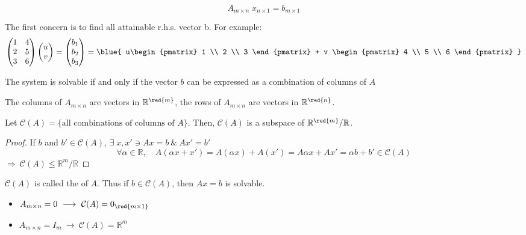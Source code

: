 \newpage

\begin{eg}
    \[
    A_{m\times n}\; x_{n\times 1} = b_{m\times1}
    \]
\end{eg}
The first concern is to find all attainable r.h.s. vector b. For example: 
\[
\begin{pmatrix}
    1 & 4 \\
    2 & 5 \\
    3 & 6
\end{pmatrix} \begin{pmatrix}
    u \\v
\end{pmatrix} = \begin{pmatrix}
    b_1 \\ b_2 \\ b_3
\end{pmatrix} = \blue{
    u\begin{pmatrix}
        1 \\ 2 \\ 3
    \end{pmatrix} + v \begin{pmatrix}
        4 \\ 5 \\ 6
    \end{pmatrix} 
}
\]

\begin{theorem}
    The system is solvable if and only if the vector $b$ can be expressed as a combination of columns of $A$
\end{theorem}

\begin{note}
The columns of $A_{m\times n}$ are vectors in $\mathbb{R}^{\red{m}}$, the rows of $A_{m\times n}$ are vectors in $\mathbb{R}^{\red{n}}$. 
\end{note}

\begin{eg}
Let $\mathcal{C}(A) = \{ \text{all combinations of columns of } A \}$. Then, $\mathcal{C}(A)$ is a subspace of $\mathbb{R}^{\red{m}}/\mathbb{R}$.
\end{eg}
\begin{proof}
    If $b$ and $b' \in \mathcal{C}(A)$, $\exists \; x, x' \ni Ax = b\ \& \ Ax' = b'$
    \[
        \forall \alpha \in \mathbb{R}, \quad A(\alpha x + x') = A(\alpha x) + A(x') = A \alpha x + Ax' = \alpha b + b' \in \mathcal{C}(A)
    \]
    $\Longrightarrow\ \mathcal{C}(A) \leq \mathbb{R}^m/\mathbb{R}$
\end{proof}

\begin{definition}
    $\mathcal{C}(A)$ is called the  of $A$. Thus if $b \in \mathcal{C}(A)$, then $Ax=b$ is solvable.
    \begin{itemize}
        \item $A_{m \times n} = 0 \ \longrightarrow \ \mathcal{C}(A) = 0_{\red{m \times 1}}$
        \item $A_{m \times n} = I_m \ \longrightarrow \ \mathcal{C}(A) = \mathbb{R}^m$
    \end{itemize}
\end{definition}